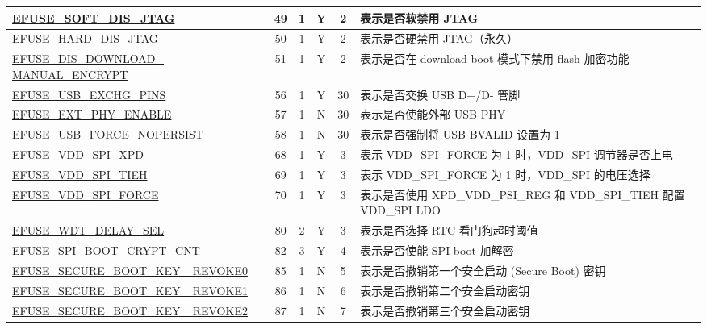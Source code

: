 \begin{longtable}[l]{ |m{5.2cm}|c|c|c|c|m{5.5cm}| }
    \hline
    \hyperref[fielddesc:EFUSESOFTDISJTAG]{EFUSE\_SOFT\_DIS\_JTAG} & 49 & 1 & Y & 2 & 表示是否软禁用 JTAG \\    
    \hline
    \hyperref[fielddesc:EFUSEHARDDISJTAG]{EFUSE\_HARD\_DIS\_JTAG} & 50 & 1 & Y & 2 & 表示是否硬禁用 JTAG（永久） \\   
    \hline
    \hyperref[fielddesc:EFUSEDISDOWNLOADMANUALENCRYPT]{EFUSE\_DIS\_DOWNLOAD\_ MANUAL\_ENCRYPT} & 51 &  1 & Y & 2 & 表示是否在 download boot 模式下禁用 flash 加密功能 \\ 
    \hline
    \hyperref[fielddesc:EFUSEUSBEXCHGPINS]{EFUSE\_USB\_EXCHG\_PINS} & 56 & 1 & Y & 30 & 表示是否交换 USB D+/D- 管脚 \\
    \hline
    \hyperref[fielddesc:EFUSEEXTPHYENABLE]{EFUSE\_EXT\_PHY\_ENABLE} & 57 & 1 & N & 30 & 表示是否使能外部 USB PHY \\
    \hline
    \hyperref[fielddesc:EFUSEUSBFORCENOPERSIST]{EFUSE\_USB\_FORCE\_NOPERSIST} & 58 & 1 & N & 30 & 表示是否强制将 USB BVALID 设置为 1 \\    
    \hline
    \hyperref[fielddesc:EFUSEVDDSPIXPD]{EFUSE\_VDD\_SPI\_XPD} & 68 & 1 & Y & 3 & 表示 VDD\_SPI\_FORCE 为 1 时，VDD\_SPI 调节器是否上电 \\        
    \hline
    \hyperref[fielddesc:EFUSEVDDSPITIEH]{EFUSE\_VDD\_SPI\_TIEH} & 69 & 1 & Y & 3 & 表示 VDD\_SPI\_FORCE 为 1 时，VDD\_SPI 的电压选择 \\   
    \hline
    \hyperref[fielddesc:EFUSEVDDSPIFORCE]{EFUSE\_VDD\_SPI\_FORCE} & 70 & 1 & Y & 3 & 表示是否使用 XPD\_VDD\_PSI\_REG 和 VDD\_SPI\_TIEH 配置 VDD\_SPI LDO \\ 
    \hline
    \hyperref[fielddesc:EFUSEWDTDELAYSEL]{EFUSE\_WDT\_DELAY\_SEL} & 80 & 2 & Y & 3 & 表示是否选择 RTC 看门狗超时阈值 \\
    \hline
    \hyperref[fielddesc:EFUSESPIBOOTCRYPTCNT]{EFUSE\_SPI\_BOOT\_CRYPT\_CNT} & 82 & 3 & Y & 4 & 表示是否使能 SPI boot 加解密 \\
    \hline
    \hyperref[fielddesc:EFUSESECUREBOOTKEYREVOKE0]{EFUSE\_SECURE\_BOOT\_KEY\_ REVOKE0} & 85 & 1 & N & 5 & 表示是否撤销第一个安全启动 (Secure Boot) 密钥 \\
    \hline
    \hyperref[fielddesc:EFUSESECUREBOOTKEYREVOKE1]{EFUSE\_SECURE\_BOOT\_KEY\_ REVOKE1} & 86 & 1 & N & 6 & 表示是否撤销第二个安全启动密钥 \\
    \hline
    \hyperref[fielddesc:EFUSESECUREBOOTKEYREVOKE2]{EFUSE\_SECURE\_BOOT\_KEY\_ REVOKE2} & 87 & 1 & N & 7 & 表示是否撤销第三个安全启动密钥 \\

\end{longtable}

